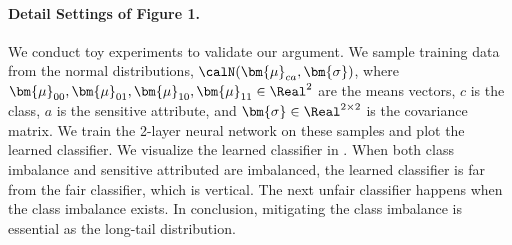 \begin{table}[t]
\centering
\caption{CIFAR100-LT, ResNet32, ablation in terms of the number of additional data
}
    \label{tab:cifar100_lt_abl}
\end{table}






\paragraph{Detail Settings of Figure 1.}
We conduct toy experiments to validate our argument.
We sample training data from the normal distributions, $\calN(\bm{\mu}_{ca}, \bm{\sigma})$, where $\bm{\mu}_{00}, \bm{\mu}_{01}, \bm{\mu}_{10}, \bm{\mu}_{11} \in \Real^{2}$ are the means vectors, $c$ is the class, $a$ is the sensitive attribute, and $\bm{\sigma} \in \Real^{2\times 2}$ is the covariance matrix.
We train the 2-layer neural network on these samples and plot the learned classifier.
We visualize the learned classifier in .
When both class imbalance and sensitive attributed are imbalanced, the learned classifier is far from the fair classifier, which is vertical.
The next unfair classifier happens when the class imbalance exists.
In conclusion, mitigating the class imbalance is essential as the long-tail distribution.